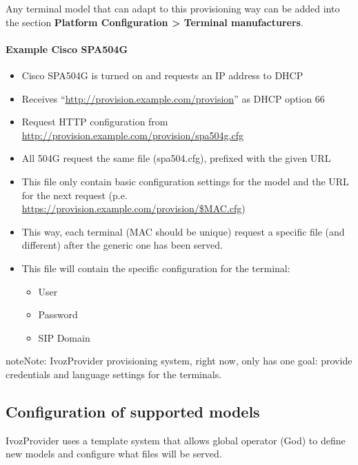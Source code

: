 \documentclass[letterpaper,10pt,english]{sphinxmanual}
\begin{document}
Any terminal model that can adapt to this provisioning way can be added into
the section \textbf{Platform Configuration \textgreater{} Terminal manufacturers}.
\paragraph{Example Cisco SPA504G}
\begin{itemize}
\item {} 
Cisco SPA504G is turned on and requests an IP address to DHCP

\item {} 
Receives “\url{http://provision.example.com/provision}” as DHCP option 66

\item {} 
Request HTTP configuration from \url{http://provision.example.com/provision/spa504g.cfg}

\item {} 
All 504G request the same file (spa504.cfg), prefixed with the given URL

\item {} 
This file only contain basic configuration settings for the model and the URL
for the next request (p.e. \url{https://provision.example.com/provision/\$MAC.cfg})

\item {} 
This way, each terminal (MAC should be unique) request a specific file
(and different) after the generic one has been served.

\item {} 
This file will contain the specific configuration for the terminal:
\begin{itemize}
\item {} 
User

\item {} 
Password

\item {} 
SIP Domain

\end{itemize}

\end{itemize}

\begin{notice}{note}{Note:}
IvozProvider provisioning system, right now, only has one goal:
provide credentials and language settings for the terminals.
\end{notice}


\subsection{Configuration of supported models}
\label{administration_portal/platform/terminal_manufacturers:configuration-of-supported-models}
IvozProvider uses a template system that allows global operator (God) to
define new models and configure what files will be served.
\end{document}
